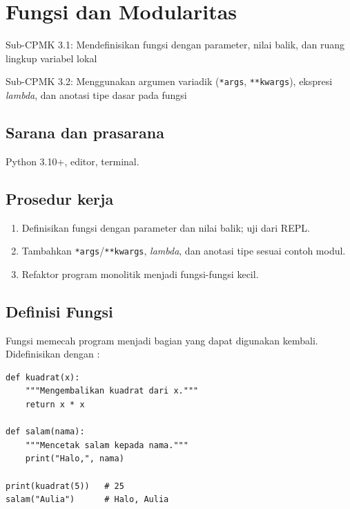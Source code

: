 ﻿\documentclass[../main.tex]{subfiles}
\begin{document}
\chapter{Fungsi dan Modularitas}

\begin{subcpmk}
  \item Sub-CPMK 3.1: Mendefinisikan fungsi dengan parameter, nilai balik, dan ruang lingkup variabel lokal
  \item Sub-CPMK 3.2: Menggunakan argumen variadik (\texttt{*args}, \texttt{**kwargs}), ekspresi \textit{lambda}, dan anotasi tipe dasar pada fungsi
\end{subcpmk}


\section{Sarana dan prasarana}

Python 3.10+, editor, terminal.

\section{Prosedur kerja}

\begin{enumerate}[leftmargin=*]
  \item Definisikan fungsi dengan parameter dan nilai balik; uji dari REPL.
  \item Tambahkan \texttt{*args}/\texttt{**kwargs}, \textit{lambda}, dan anotasi tipe sesuai contoh modul.
  \item Refaktor program monolitik menjadi fungsi-fungsi kecil.
\end{enumerate}

\section{Definisi Fungsi}

Fungsi memecah program menjadi bagian yang dapat digunakan kembali. Didefinisikan dengan :

\begin{lstlisting}[caption=Fungsi sederhana (Tutorial Python ss4.8)]
def kuadrat(x):
    """Mengembalikan kuadrat dari x."""
    return x * x

def salam(nama):
    """Mencetak salam kepada nama."""
    print("Halo,", nama)

print(kuadrat(5))   # 25
salam("Aulia")      # Halo, Aulia
\end{lstlisting}
\end{document}
